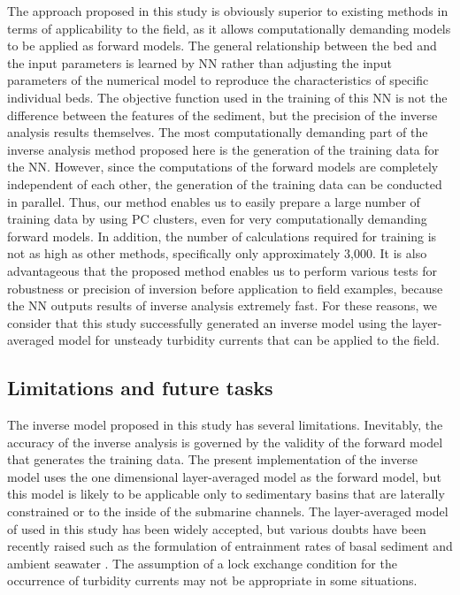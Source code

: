 The approach proposed in this study is obviously superior to existing methods in terms of applicability to the field, as it allows computationally demanding models to be applied as forward models. The general relationship between the bed and the input parameters is learned by NN rather than adjusting the input parameters of the numerical model to reproduce the characteristics of specific individual beds. The objective function used in the training of this NN is not the difference between the features of the sediment, but the precision of the inverse analysis results themselves. The most computationally demanding part of the inverse analysis method proposed here is the generation of the training data for the NN. However, since the computations of the forward models are completely independent of each other, the generation of the training data can be conducted in parallel. Thus, our method enables us to easily prepare a large number of training data by using PC clusters, even for very computationally demanding forward models. In addition, the number of calculations required for training is not as high as other methods, specifically only approximately 3,000. It is also advantageous that the proposed method enables us to perform various tests for robustness or precision of inversion before application to field examples, because the NN outputs results of inverse analysis extremely fast. For these reasons, we consider that this study successfully generated an inverse model using the layer-averaged model for unsteady turbidity currents that can be applied to the field. 

\subsection{Limitations and future tasks}

The inverse model proposed in this study has several limitations. Inevitably, the accuracy of the inverse analysis is governed by the validity of the forward model that generates the training data. The present implementation of the inverse model uses the one dimensional layer-averaged model as the forward model, but this model is likely to be applicable only to sedimentary basins that are laterally constrained or to the inside of the submarine channels. The layer-averaged model of \citet{parker1986self} used in this study has been widely accepted, but various doubts have been recently raised such as the formulation of entrainment rates of basal sediment \citep{Dorrell2018} and ambient seawater \citep{Luchi2018}. The assumption of a lock exchange condition for the occurrence of turbidity currents may not be appropriate in some situations. 

